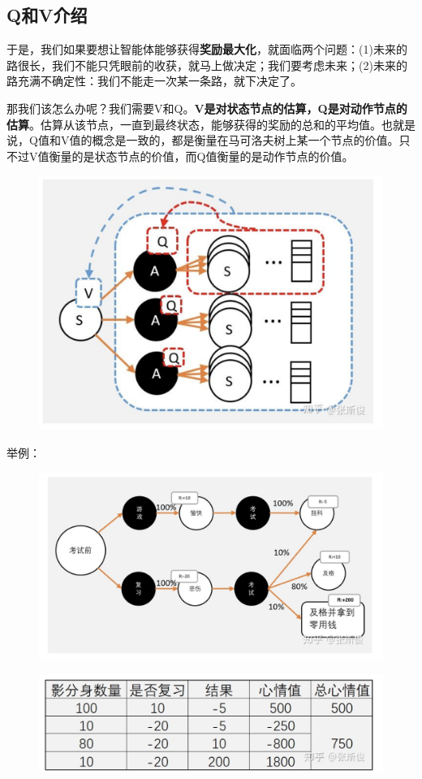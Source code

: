 \documentclass[12pt]{article}
\begin{document}
\subsection{Q和V介绍}
于是，我们如果要想让智能体能够获得\textbf{奖励最大化}，就面临两个问题：(1)未来的路很长，我们不能只凭眼前的收获，就马上做决定；我们要考虑未来；(2)未来的路充满不确定性：我们不能走一次某一条路，就下决定了。

那我们该怎么办呢？我们需要V和Q。\textbf{V是对状态节点的估算，Q是对动作节点的估算}。估算从该节点，一直到最终状态，能够获得的奖励的总和的平均值。也就是说，Q值和V值的概念是一致的，都是衡量在马可洛夫树上某一个节点的价值。只不过V值衡量的是状态节点的价值，而Q值衡量的是动作节点的价值。
\begin{figure}[H]
    \centering
    \includegraphics[width=.5\textwidth]{fig/ReinforcementLearning/RL_V_Q_Estimation.png}
\end{figure}

\begin{framed}
\small{
举例：
\begin{figure}[H]
    \centering
    \includegraphics[width=1\textwidth]{fig/ReinforcementLearning/RL_V_Q_R_Example_1.png}
\end{figure}
\begin{figure}[H]
    \centering
    \includegraphics[width=.8\textwidth]{fig/ReinforcementLearning/RL_V_Q_R_Example_2.png}
\end{figure}
}
\end{framed}
\end{document}
